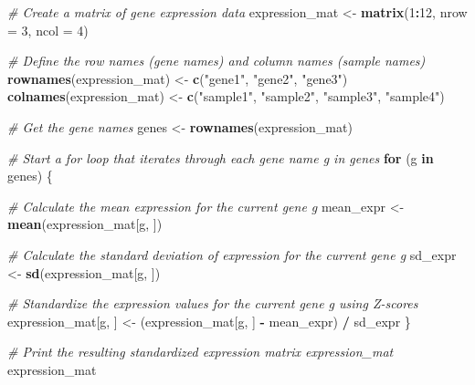 \documentclass[
]{book}
\newenvironment{Shaded}{\begin{snugshade}}{\end{snugshade}}
\newcommand{\AttributeTok}[1]{\textcolor[rgb]{0.13,0.29,0.53}{#1}}
\newcommand{\CommentTok}[1]{\textcolor[rgb]{0.56,0.35,0.01}{\textit{#1}}}
\newcommand{\ControlFlowTok}[1]{\textcolor[rgb]{0.13,0.29,0.53}{\textbf{#1}}}
\newcommand{\DecValTok}[1]{\textcolor[rgb]{0.00,0.00,0.81}{#1}}
\newcommand{\FunctionTok}[1]{\textcolor[rgb]{0.13,0.29,0.53}{\textbf{#1}}}
\newcommand{\NormalTok}[1]{#1}
\newcommand{\OtherTok}[1]{\textcolor[rgb]{0.56,0.35,0.01}{#1}}
\newcommand{\SpecialCharTok}[1]{\textcolor[rgb]{0.81,0.36,0.00}{\textbf{#1}}}
\newcommand{\StringTok}[1]{\textcolor[rgb]{0.31,0.60,0.02}{#1}}
\begin{document}
\begin{Shaded}
\begin{Highlighting}[]
\CommentTok{\# Create a matrix of gene expression data}
\NormalTok{expression\_mat }\OtherTok{\textless{}{-}} \FunctionTok{matrix}\NormalTok{(}\DecValTok{1}\SpecialCharTok{:}\DecValTok{12}\NormalTok{, }\AttributeTok{nrow =} \DecValTok{3}\NormalTok{, }\AttributeTok{ncol =} \DecValTok{4}\NormalTok{)}

\CommentTok{\# Define the row names (gene names) and column names (sample names)}
\FunctionTok{rownames}\NormalTok{(expression\_mat) }\OtherTok{\textless{}{-}} \FunctionTok{c}\NormalTok{(}\StringTok{"gene1"}\NormalTok{, }\StringTok{"gene2"}\NormalTok{, }\StringTok{"gene3"}\NormalTok{)}
\FunctionTok{colnames}\NormalTok{(expression\_mat) }\OtherTok{\textless{}{-}} \FunctionTok{c}\NormalTok{(}\StringTok{"sample1"}\NormalTok{, }\StringTok{"sample2"}\NormalTok{, }\StringTok{"sample3"}\NormalTok{, }\StringTok{"sample4"}\NormalTok{)}

\CommentTok{\# Get the gene names}
\NormalTok{genes }\OtherTok{\textless{}{-}} \FunctionTok{rownames}\NormalTok{(expression\_mat)}

\CommentTok{\# Start a for loop that iterates through each gene name \textquotesingle{}g\textquotesingle{} in \textquotesingle{}genes\textquotesingle{}}
\ControlFlowTok{for}\NormalTok{ (g }\ControlFlowTok{in}\NormalTok{ genes) \{}
  
  \CommentTok{\# Calculate the mean expression for the current gene \textquotesingle{}g\textquotesingle{}}
\NormalTok{  mean\_expr }\OtherTok{\textless{}{-}} \FunctionTok{mean}\NormalTok{(expression\_mat[g, ]) }
  
  \CommentTok{\# Calculate the standard deviation of expression for the current gene \textquotesingle{}g\textquotesingle{}}
\NormalTok{  sd\_expr }\OtherTok{\textless{}{-}} \FunctionTok{sd}\NormalTok{(expression\_mat[g, ])}
  
  \CommentTok{\# Standardize the expression values for the current gene \textquotesingle{}g\textquotesingle{} using Z{-}scores}
\NormalTok{  expression\_mat[g, ] }\OtherTok{\textless{}{-}}\NormalTok{ (expression\_mat[g, ] }\SpecialCharTok{{-}}\NormalTok{ mean\_expr) }\SpecialCharTok{/}\NormalTok{ sd\_expr}
\NormalTok{\}}

\CommentTok{\# Print the resulting standardized expression matrix \textquotesingle{}expression\_mat\textquotesingle{}}
\NormalTok{expression\_mat}
\end{Highlighting}
\end{Shaded}
\end{document}
